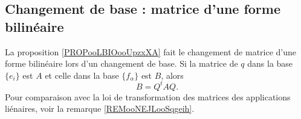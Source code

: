 \subsection{Changement de base : matrice d'une forme bilinéaire}

La proposition \ref{PROPooLBIOooUpzxXA} fait le changement de matrice d'une forme bilinéaire lors d'un changement de base. Si la matrice de \( q\) dans la base \( \{ e_i \}\) est \( A\) et celle dans la base \( \{ f_{\alpha} \}\) est \( B\), alors
\begin{equation}
    B=Q^tAQ.
\end{equation}
Pour comparaison avec la loi de transformation des matrices des applications liénaires, voir la remarque \ref{REMooNEJLooSqgeih}.

